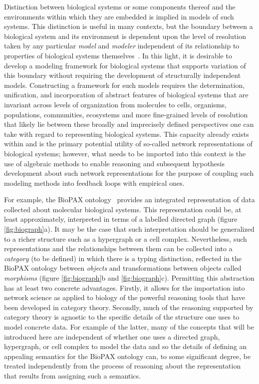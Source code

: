 \documentclass[aps,twocolumn]{revtex4-1}
\begin{document}
Distinction between biological systems or some components thereof and the environments within which they are embedded is implied in models of such systems. This distinction is useful in many contexts, but the boundary between a biological system and its environment is dependent upon the level of resolution taken by any particular \emph{model} and \emph{modeler} independent of its relationship to properties of biological systems themselves~\cite{Fontana1996}. In this light, it is desirable to develop a modeling framework for biological systems that supports variation of this boundary without requiring the development of structurally independent models. Constructing a framework for such models requires the determination, unification, and incorporation of abstract features of biological systems that are invariant across levels of organization from molecules to cells, organisms, populations, communities, ecosystems and more fine-grained levels of resolution that likely lie between these broadly and imprecisely defined perspectives one can take with regard to representing biological systems. This capacity already exists within and is the primary potential utility of so-called network representations of biological systems; however, what needs to be imported into this context is the use of algebraic methods to enable reasoning and subsequent hypothesis development about such network representations for the purpose of coupling such modeling methods into feedback loops with empirical ones.

For example, the BioPAX ontology~\cite{Demir2010} provides an integrated representation of data collected about molecular biological systems. This representation could be, at least approximately, interpreted in terms of a labelled directed graph (figure \ref{fig:biograph}a). It may be the case that such interpretation should be generalized to a richer structure such as a hypergraph or a cell complex. Nevertheless, such representations and the relationships between them can be collected into a \emph{category} (to be defined) in which there is a typing distinction, reflected in the BioPAX ontology between \emph{objects} and transformations between objects called \emph{morphisms} (figure \ref{fig:biograph}b and \ref{fig:biograph}c). Permitting this abstraction has at least two concrete advantages. Firstly, it allows for the importation into network science as applied to biology of the powerful reasoning tools that have been developed in category theory. Secondly, much of the reasoning supported by category theory is agnostic to the specific details of the structure one uses to model concrete data. For example of the latter, many of the concepts that will be introduced here are independent of whether one uses a directed graph, hypergraph, or cell complex to model the data and so the details of defining an appealing semantics for the BioPAX ontology can, to some significant degree, be treated independently from the process of reasoning about the representation that results from assigning such a semantics.
\end{document}
